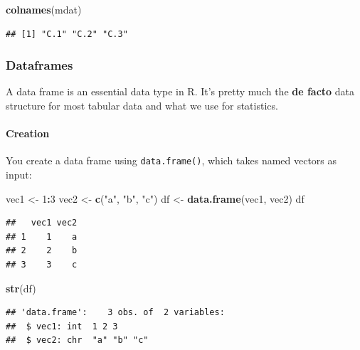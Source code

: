 \documentclass[
]{book}
\newenvironment{Shaded}{\begin{snugshade}}{\end{snugshade}}
\newcommand{\DecValTok}[1]{\textcolor[rgb]{0.00,0.00,0.81}{#1}}
\newcommand{\FunctionTok}[1]{\textcolor[rgb]{0.13,0.29,0.53}{\textbf{#1}}}
\newcommand{\NormalTok}[1]{#1}
\newcommand{\OtherTok}[1]{\textcolor[rgb]{0.56,0.35,0.01}{#1}}
\newcommand{\SpecialCharTok}[1]{\textcolor[rgb]{0.81,0.36,0.00}{\textbf{#1}}}
\newcommand{\StringTok}[1]{\textcolor[rgb]{0.31,0.60,0.02}{#1}}
\begin{document}
\begin{Shaded}
\begin{Highlighting}[]
\FunctionTok{colnames}\NormalTok{(mdat)}
\end{Highlighting}
\end{Shaded}

\begin{verbatim}
## [1] "C.1" "C.2" "C.3"
\end{verbatim}

\subsubsection{Dataframes}\label{dataframes}

A data frame is an essential data type in R. It's pretty much the \textbf{de facto} data structure for most tabular data and what we use for statistics.

\paragraph{Creation}\label{creation}

You create a data frame using \texttt{data.frame()}, which takes named vectors as input:

\begin{Shaded}
\begin{Highlighting}[]
\NormalTok{vec1 }\OtherTok{\textless{}{-}} \DecValTok{1}\SpecialCharTok{:}\DecValTok{3}
\NormalTok{vec2 }\OtherTok{\textless{}{-}} \FunctionTok{c}\NormalTok{(}\StringTok{"a"}\NormalTok{, }\StringTok{"b"}\NormalTok{, }\StringTok{"c"}\NormalTok{)}
\NormalTok{df }\OtherTok{\textless{}{-}} \FunctionTok{data.frame}\NormalTok{(vec1, vec2)}
\NormalTok{df}
\end{Highlighting}
\end{Shaded}

\begin{verbatim}
##   vec1 vec2
## 1    1    a
## 2    2    b
## 3    3    c
\end{verbatim}

\begin{Shaded}
\begin{Highlighting}[]
\FunctionTok{str}\NormalTok{(df)}
\end{Highlighting}
\end{Shaded}

\begin{verbatim}
## 'data.frame':    3 obs. of  2 variables:
##  $ vec1: int  1 2 3
##  $ vec2: chr  "a" "b" "c"
\end{verbatim}
\end{document}
